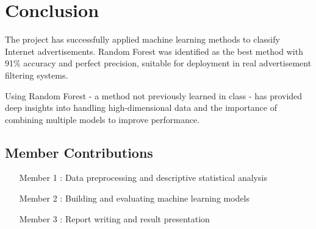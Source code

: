 \documentclass[twoside,final]{hcmut-report}
\begin{document}
\section{Conclusion}
\label{sec:conclusion}

The project has successfully applied machine learning methods to classify Internet advertisements. Random Forest was identified as the best method with 91\% accuracy and perfect precision, suitable for deployment in real advertisement filtering systems.

Using Random Forest - a method not previously learned in class - has provided deep insights into handling high-dimensional data and the importance of combining multiple models to improve performance.

\subsection{Member Contributions}
\begin{itemize}
  \item [Member 1]: Data preprocessing and descriptive statistical analysis
  \item [Member 2]: Building and evaluating machine learning models
  \item [Member 3]: Report writing and result presentation
\end{itemize}

\clearpage



\nocite{*}
\end{document}
